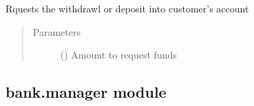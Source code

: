 \documentclass[letterpaper,10pt,english]{sphinxmanual}
\begin{document}
\begin{fulllineitems}
\begin{fulllineitems}
\begin{quote}
\begin{description}
\end{description}\end{quote}

\end{fulllineitems}


\begin{fulllineitems}
\label{\detokenize{bank:bank.customer.Customer.requestDelta}}
Rquests the withdrawl or deposit into customer’s account
\begin{quote}\begin{description}
\item[{Parameters}] \leavevmode
{} () \textendash{} Amount to request funds

\end{description}\end{quote}

\end{fulllineitems}


\end{fulllineitems}



\subsection{bank.manager module}
\label{\detokenize{bank:module-bank.manager}}\label{\detokenize{bank:bank-manager-module}}
\end{document}
